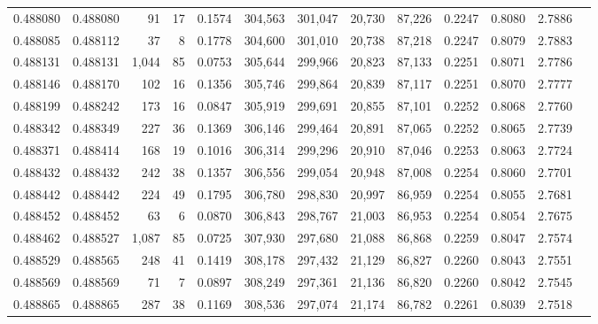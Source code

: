 \begin{tabular}{rrrrrrrrrrrrr}
0.488080 & 0.488080 &    91 &    17 &                                     0.1574 & 304,563 & 301,047 &  20,730 &  87,226 & 0.2247 & 0.8080 & 2.7886 \\
0.488085 & 0.488112 &    37 &     8 &                                     0.1778 & 304,600 & 301,010 &  20,738 &  87,218 & 0.2247 & 0.8079 & 2.7883 \\
0.488131 & 0.488131 & 1,044 &    85 &                                     0.0753 & 305,644 & 299,966 &  20,823 &  87,133 & 0.2251 & 0.8071 & 2.7786 \\
0.488146 & 0.488170 &   102 &    16 &                                     0.1356 & 305,746 & 299,864 &  20,839 &  87,117 & 0.2251 & 0.8070 & 2.7777 \\
0.488199 & 0.488242 &   173 &    16 &                                     0.0847 & 305,919 & 299,691 &  20,855 &  87,101 & 0.2252 & 0.8068 & 2.7760 \\
0.488342 & 0.488349 &   227 &    36 &                                     0.1369 & 306,146 & 299,464 &  20,891 &  87,065 & 0.2252 & 0.8065 & 2.7739 \\
0.488371 & 0.488414 &   168 &    19 &                                     0.1016 & 306,314 & 299,296 &  20,910 &  87,046 & 0.2253 & 0.8063 & 2.7724 \\
0.488432 & 0.488432 &   242 &    38 &                                     0.1357 & 306,556 & 299,054 &  20,948 &  87,008 & 0.2254 & 0.8060 & 2.7701 \\
0.488442 & 0.488442 &   224 &    49 &                                     0.1795 & 306,780 & 298,830 &  20,997 &  86,959 & 0.2254 & 0.8055 & 2.7681 \\
0.488452 & 0.488452 &    63 &     6 &                                     0.0870 & 306,843 & 298,767 &  21,003 &  86,953 & 0.2254 & 0.8054 & 2.7675 \\
0.488462 & 0.488527 & 1,087 &    85 &                                     0.0725 & 307,930 & 297,680 &  21,088 &  86,868 & 0.2259 & 0.8047 & 2.7574 \\
0.488529 & 0.488565 &   248 &    41 &                                     0.1419 & 308,178 & 297,432 &  21,129 &  86,827 & 0.2260 & 0.8043 & 2.7551 \\
0.488569 & 0.488569 &    71 &     7 &                                     0.0897 & 308,249 & 297,361 &  21,136 &  86,820 & 0.2260 & 0.8042 & 2.7545 \\
0.488865 & 0.488865 &   287 &    38 &                                     0.1169 & 308,536 & 297,074 &  21,174 &  86,782 & 0.2261 & 0.8039 & 2.7518 \\

\end{tabular}
